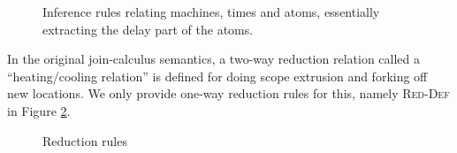 \begin{figure}[!h]
\caption{Inference rules relating machines, times and atoms, essentially extracting the delay part of the atoms.}
\label{fig:rule:sched}
\end{figure}

In the original join-calculus semantics, a two-way reduction relation called a
``heating/cooling relation'' is defined for doing scope extrusion and forking
off new locations. We only provide one-way reduction rules for this, namely \textsc{Red-Def} in Figure \ref{fig:rule:red}.
\begin{figure}[!h]
\caption{Reduction rules}\label{fig:rule:red}
\end{figure}

